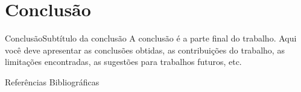\documentclass[11pt]{beamer}
\begin{document}
    \section{Conclusão}

        \begin{frame}{Conclusão}{Subtítulo da conclusão}
            A conclusão é a parte final do trabalho. Aqui você deve apresentar
            as conclusões obtidas, as contribuições do trabalho, as limitações
            encontradas, as sugestões para trabalhos futuros, etc.
        \end{frame}

        \begin{frame}{Referências Bibliográficas}
            
            
        \end{frame}
\end{document}
